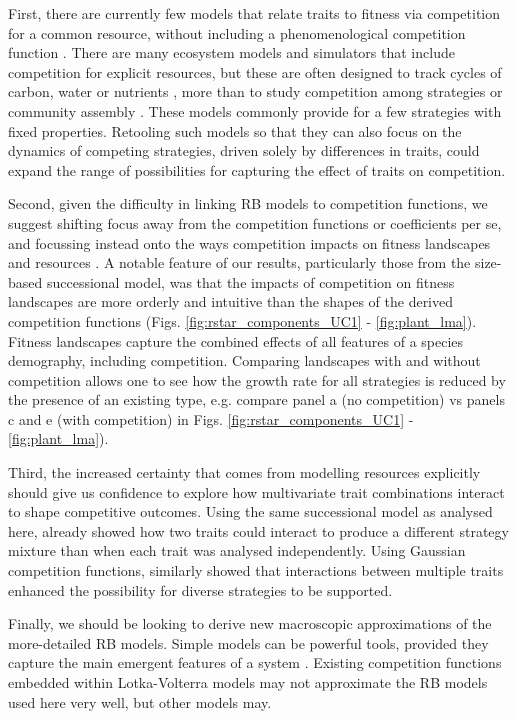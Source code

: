 \documentclass[a4paper,11pt]{article}
\begin{document}
First, there are currently few models that relate traits to fitness via competition for a common resource, without including a phenomenological competition function \citep{DAndrea-2016a}. There are many ecosystem models and simulators that include competition for explicit resources, but these are often designed to track cycles of carbon, water or nutrients \citep{Moorcroft-2001, Medvigy-2012, Smith-2014,Fisher-2018}, more than to study competition among strategies or community assembly \citep{Kohyama-1993, Falster-2017}. These models commonly provide for a few strategies with fixed properties. Retooling such models so that they can also focus on the dynamics of competing strategies, driven solely by differences in traits, could expand the range of possibilities for capturing the effect of traits on competition.

Second, given the difficulty in linking RB models to competition functions, we suggest shifting focus away from the competition functions or coefficients per se, and focussing instead onto the ways competition impacts on fitness landscapes and resources \citep[see also][]{Laughlin-2020}. A notable feature of our results, particularly those from the size-based successional model, was that the impacts of competition on fitness landscapes are more orderly and intuitive than the shapes of the derived competition functions (Figs. \ref{fig:rstar_components_UC1} - \ref{fig:plant_lma}). Fitness landscapes capture the combined effects of all features of a species demography, including competition. Comparing landscapes with and without competition allows one to see how the growth rate for all strategies is reduced by the presence of an existing type, e.g. compare panel a (no competition) vs panels c and e (with competition) in Figs. \ref{fig:rstar_components_UC1} - \ref{fig:plant_lma}). 

Third, the increased certainty that comes from modelling resources explicitly should give us confidence to explore how multivariate trait combinations interact to shape competitive outcomes. Using the same successional model as analysed here, \citet{Falster-2017} already showed how two traits could interact to produce a different strategy mixture than when each trait was analysed independently. Using Gaussian competition functions, \citet{Doebeli-2010} similarly showed that interactions between multiple traits enhanced the possibility for diverse strategies to be supported. 

Finally, we should be looking to derive new macroscopic approximations of the more-detailed RB models. Simple models can be powerful tools, provided they capture the main emergent features of a system \citep{Levin-2006}. Existing competition functions embedded within Lotka-Volterra models may not approximate the RB models used here very well, but other models may.
\end{document}
